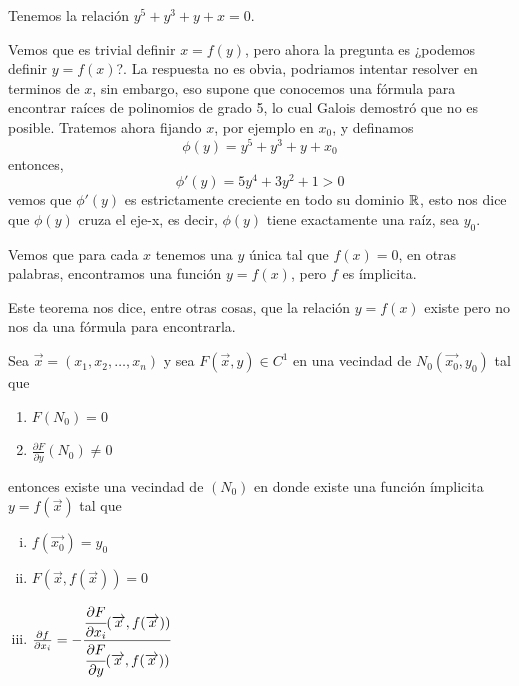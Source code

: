 \begin{example}
    Tenemos la relaci\'on $y^{5}+y^{3}+y+x=0$.
\end{example}

    Vemos que es trivial definir $x=f(y)$, pero ahora la pregunta es ¿podemos
    definir $y=f(x)$?. La respuesta no es obvia, podriamos intentar resolver
    en terminos de $x$, sin embargo, eso supone que conocemos una f\'ormula para encontrar ra\'ices de 
    polinomios de grado 5, lo cual Galois demostró que no es posible. Tratemos
    ahora fijando $x$, por ejemplo en $x_{0}$, y definamos
    $$ \phi(y)=y^{5}+y^{3}+y+x_{0}$$
    entonces,
    $$\phi'(y)=5y^{4}+3y^{2}+1 > 0$$
    vemos que $\phi'(y)$ es estrictamente creciente en todo su dominio $\mathbb{R}$,
    esto nos dice que $\phi(y)$ cruza el eje-x, es decir, $\phi(y)$ tiene exactamente
    una ra\'iz, sea $y_{0}$.

    Vemos que para cada $x$ tenemos una $y$ \'unica tal que $f(x)=0$, en otras
    palabras, encontramos una funci\'on $y=f(x)$, pero $f$ es \'implicita.

    Este teorema nos dice, entre otras cosas, que la relaci\'on $y=f(x)$
    existe pero no nos da una f\'ormula para encontrarla.

\clearpage

\begin{theorem}
    Sea $\overrightarrow{x} = (x_{1},x_{2},\ldots,x_{n})$ y sea $F(\overrightarrow{x},y) \in C^{1}$ 
    en una vecindad de $N_{0}(\overrightarrow{x_{0}},y_{0})$ tal que
    \begin{enumerate}
        \item $F(N_{0}) = 0$
        \item $\frac{\partial F}{\partial y}(N_{0}) \ne 0$
    \end{enumerate}
    entonces existe una vecindad de $(N_{0})$ en donde existe una
    funci\'on \'implicita $y=f(\overrightarrow{x})$ tal que
    \begin{enumerate}[i.]
        \item $f(\overrightarrow{x_{0}}) = y_{0}$
        \item $F(\overrightarrow{x}, f(\overrightarrow{x})) = 0$
        \item $\frac{\partial f}{\partial x_{i}} = -\cfrac{\cfrac{\partial F}{\partial x_{i}}(\overrightarrow{x},f(\overrightarrow{x}))}{\cfrac{\partial F}{\partial y}(\overrightarrow{x},f(\overrightarrow{x}))}$
    \end{enumerate}
\end{theorem}

